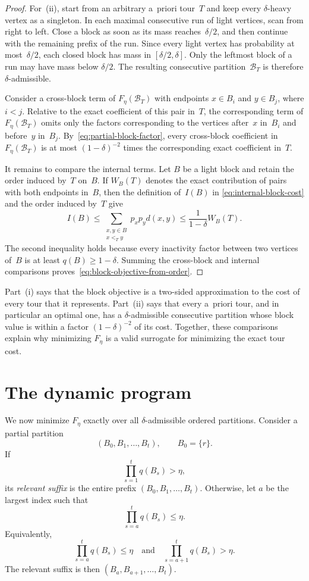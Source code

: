 \documentclass[12pt,a4paper,oneside]{report}
\begin{document}
\begin{proof}
For~(ii), start from an arbitrary a~priori tour~$T$ and keep every $\delta$-heavy vertex
as a singleton.  In each maximal consecutive run of light vertices, scan from
right to left.  Close a block as soon as its mass reaches~$\delta/2$, and then
continue with the remaining prefix of the run.  Since every light vertex has
probability at most~$\delta/2$, each closed block has mass in
$[\delta/2,\delta]$.  Only the leftmost block of a run may have mass below
$\delta/2$.  The resulting consecutive partition~$\mathcal B_T$ is therefore
$\delta$-admissible.

Consider a cross-block term of $F_\eta(\mathcal B_T)$ with endpoints
$x\in B_i$ and $y\in B_j$, where $i<j$.  Relative to the exact coefficient of
this pair in~$T$, the corresponding term of $F_\eta(\mathcal B_T)$ omits
only the factors corresponding to the vertices after~$x$ in~$B_i$ and
before~$y$ in~$B_j$.  By~\cref{eq:partial-block-factor}, every cross-block
coefficient in $F_\eta(\mathcal B_T)$ is at most
$(1-\delta)^{-2}$ times the corresponding exact coefficient in~$T$.

It remains to compare the internal terms.  Let $B$ be a light block and retain
the order induced by~$T$ on~$B$.  If $W_B(T)$ denotes the exact contribution
of pairs with both endpoints in~$B$, then the definition of~$I(B)$ in
\cref{eq:internal-block-cost} and the order induced by~$T$ give
\[
    I(B)
    \le
    \sum_{\substack{x,y\in B\\x<_T y}}p_xp_y d(x,y)
    \le
    \frac{1}{1-\delta}W_B(T).
\]
The second inequality holds because every inactivity factor between two
vertices of~$B$ is at least $q(B)\ge1-\delta$.  Summing the cross-block and
internal comparisons proves~\cref{eq:block-objective-from-order}.
\end{proof}

Part~(i) says that the block objective is a two-sided approximation to the
cost of every tour that it represents.  Part~(ii) says that every a~priori
tour, and in particular an optimal one, has a $\delta$-admissible consecutive
partition whose block value is within a factor $(1-\delta)^{-2}$ of its cost.
Together, these comparisons explain why minimizing $F_\eta$ is a valid
surrogate for minimizing the exact tour cost.

\section{The dynamic program}\label{sec:dp-dynamic-program}

We now minimize $F_\eta$ exactly over all $\delta$-admissible ordered partitions.
Consider a partial partition
\[
    (B_0,B_1,\dots,B_t),
    \qquad B_0=\{r\}.
\]
If
\[
    \prod_{s=1}^t q(B_s)>\eta,
\]
its \emph{relevant suffix} is the entire prefix
$(B_0,B_1,\dots,B_t)$.  Otherwise, let $a$ be the largest index such that
\[
    \prod_{s=a}^t q(B_s)\le\eta.
\]
Equivalently,
\[
    \prod_{s=a}^t q(B_s)\le\eta
    \quad\text{and}\quad
    \prod_{s=a+1}^t q(B_s)>\eta.
\]
The relevant suffix is then $(B_a,B_{a+1},\dots,B_t)$.
\end{document}
